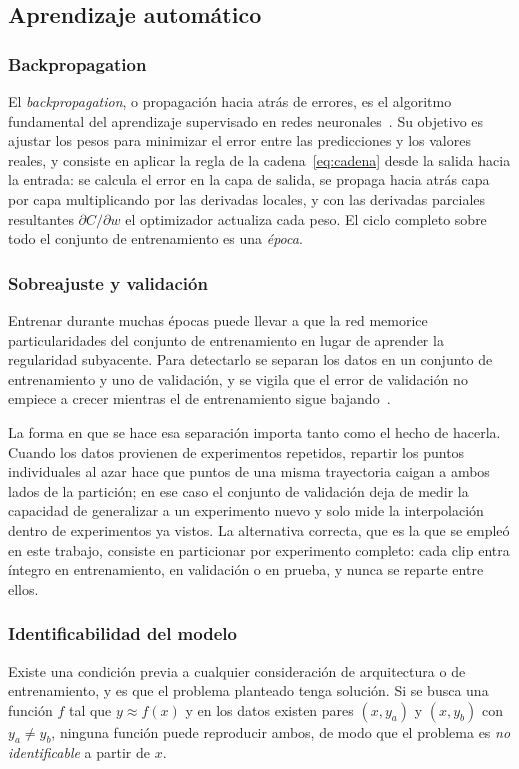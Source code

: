 \documentclass[titlepage,11pt]{article}
\begin{document}
\subsection{Aprendizaje automático}
\label{subsec:ML}

\subsubsection{Backpropagation}
El \emph{backpropagation}, o propagación hacia atrás de errores, es el
algoritmo fundamental del aprendizaje supervisado en redes
neuronales~\cite{rumelhart_1986_backprop,goodfellow_2016_deep}. Su
objetivo es ajustar los pesos para minimizar el error entre las predicciones y
los valores reales, y consiste en aplicar la regla de la
cadena~\eqref{eq:cadena} desde la salida hacia la entrada: se calcula el error
en la capa de salida, se propaga hacia atrás capa por capa multiplicando por
las derivadas locales, y con las derivadas parciales resultantes
$\partial C/\partial w$ el optimizador actualiza cada peso. El ciclo completo
sobre todo el conjunto de entrenamiento es una \emph{época}.

\subsubsection{Sobreajuste y validación}
\label{subsubsec:sobreajuste}
Entrenar durante muchas épocas puede llevar a que la red memorice
particularidades del conjunto de entrenamiento en lugar de aprender la
regularidad subyacente. Para detectarlo se separan los datos en un conjunto de
entrenamiento y uno de validación, y se vigila que el error de validación no
empiece a crecer mientras el de entrenamiento sigue
bajando~\cite{goodfellow_2016_deep,hastie_2009_elements}.

La forma en que se hace esa separación importa tanto como el hecho de hacerla.
Cuando los datos provienen de experimentos repetidos, repartir los puntos
individuales al azar hace que puntos de una misma trayectoria caigan a ambos
lados de la partición; en ese caso el conjunto de validación deja de medir la
capacidad de generalizar a un experimento nuevo y solo mide la interpolación
dentro de experimentos ya vistos. La alternativa correcta, que es la que se
empleó en este trabajo, consiste en particionar por experimento completo: cada
clip entra íntegro en entrenamiento, en validación o en prueba, y nunca se
reparte entre ellos.

\subsubsection{Identificabilidad del modelo}
\label{subsubsec:identificabilidad}
Existe una condición previa a cualquier consideración de arquitectura o de
entrenamiento, y es que el problema planteado tenga solución. Si se busca una
función $f$ tal que $y\approx f(x)$ y en los datos existen pares $(x,y_a)$ y
$(x,y_b)$ con $y_a\neq y_b$, ninguna función puede reproducir ambos, de modo
que el problema es \emph{no identificable} a partir de $x$.
\end{document}
